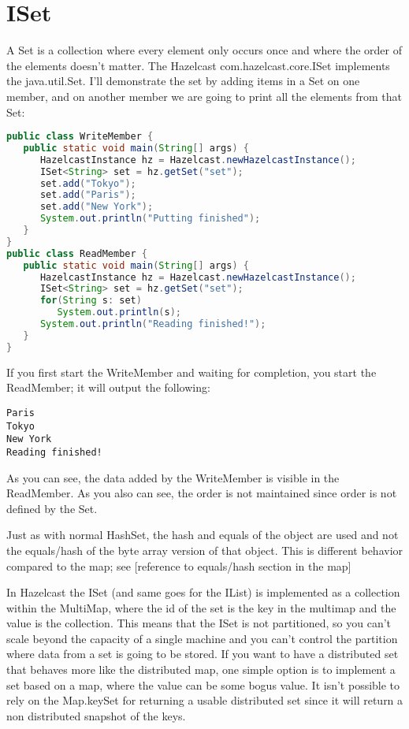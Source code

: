 \section{ISet}
A Set is a collection where every element only occurs once and where the order of the elements doesn't matter. The Hazelcast com.hazelcast.core.ISet implements the java.util.Set. I'll demonstrate the set by adding items in a Set on one member, and on another member we are going to print all the elements from that Set:
\begin{lstlisting}[language=java]
public class WriteMember {
   public static void main(String[] args) {
      HazelcastInstance hz = Hazelcast.newHazelcastInstance();
      ISet<String> set = hz.getSet("set");
      set.add("Tokyo");
      set.add("Paris");
      set.add("New York");
      System.out.println("Putting finished");
   }
}
public class ReadMember {
   public static void main(String[] args) {
      HazelcastInstance hz = Hazelcast.newHazelcastInstance();
      ISet<String> set = hz.getSet("set");
      for(String s: set) 
         System.out.println(s);
      System.out.println("Reading finished!");
   }
}
\end{lstlisting}
If you first start the WriteMember and waiting for completion, you start the ReadMember; it will output the following:
\begin{lstlisting}
Paris
Tokyo
New York
Reading finished!	
\end{lstlisting}
As you can see, the data added by the WriteMember is visible in the ReadMember. As you also can see, the order is not maintained since order is not defined by the Set.

Just as with normal HashSet, the hash and equals of the object are used and not the equals/hash of the byte array version of that object. This is different behavior compared to the map; see [reference to equals/hash section in the map]

In Hazelcast the ISet (and same goes for the IList) is implemented as a collection within the MultiMap, where the id of the set is the key in the multimap and the value is the collection. This means that the ISet is not partitioned, so you can't scale beyond the capacity of a single machine and you can't control the partition where data from a set is going to be stored. If you want to have a distributed set that behaves more like the distributed map, one simple option is to implement a set based on a map, where the value can be some bogus value. It isn't possible to rely on the Map.keySet for returning a usable distributed set since it will return a non distributed snapshot of the keys.

